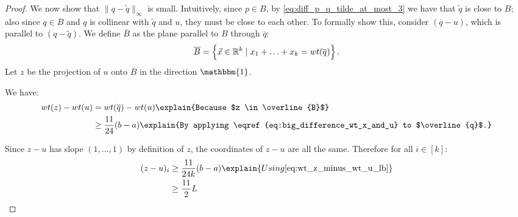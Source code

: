 \documentclass[11pt]{article}
\begin{document}
\begin{proof}
    We now show that $\|q - \widetilde{q}\|_{\infty}$ is small. Intuitively, since $p \in B$, by \eqref{eq:diff_p_q_tilde_at_most_3} we have that $\widetilde{q}$ is close to $B$; also since $q \in B$ and $q$ is collinear with $\widetilde{q}$ and $u$, they must be close to each other.
    To formally show this, consider $(\overline{q} - u)$, which is parallel to $(q - \widetilde{q})$. We define $\overline{B}$ as the plane parallel to $B$ through $\overline{q}$:
    \begin{align}
        \overline{B} = \Bigl\{\vec{x} \in \mathbb{R}^k \mid x_1 + \ldots + x_k = wt(\overline{q})\Bigr\}\,.
    \end{align}
    Let $z$ be the projection of $u$ onto $\overline{B}$ in the direction $\mathbbm{1}$. 

    We have:
    \begin{align}
        wt(z) - wt(u) & = wt(\overline{q}) - wt(u) \explain{Because $z \in \overline{B}$}\\
        & \geq \frac{11}{24}(b-a) \explain{By applying \eqref{eq:big_difference_wt_x_and_u} to $\overline{q}$.}\\
        \label{eq:wt_z_minus_wt_u_lb}
    \end{align}

    Since $z - u$ has slope $(1, \ldots, 1)$ by definition of $z$, the coordinates of $z-u$ are all the same. Therefore for all $i \in [k]$:
    \begin{align}
        (z-u)_i & \geq \frac{11}{24k}(b-a) \explain{Using \eqref{eq:wt_z_minus_wt_u_lb}}  \\
        & \geq \frac{11}{2}L  \label{eq:q_minus_u_i_lb}
    \end{align}


\end{proof}
\end{document}
